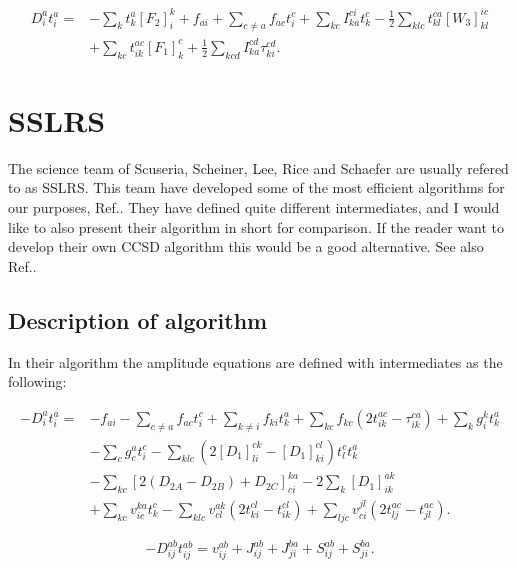 \begin{align}
D_i^a t_i^a = &
- \sum_{k} t_k^a
[F_2]_i^k
+ f_{ai} 
+ \sum_{c \not= a} f_{ac} t_i^c
+ \sum_{kc} I_{ka}^{ci} t_k^c 
- \frac{1}{2} \sum_{klc} t_{kl}^{ca} [W_3]_{kl}^{ic}
\nonumber \\ &
+ \sum_{kc} t_{ik}^{ac} [F_1]_k^c
+ \frac{1}{2} \sum_{kcd} I_{ka}^{cd} \tau_{ki}^{cd} 
.  \label{LINK_THIS_SHIT_1_T1}
\end{align}

\section{SSLRS}

The science team of Scuseria, Scheiner, Lee, Rice and Schaefer are usually refered to as SSLRS. This team have developed some of the most efficient algorithms for our purposes, Ref.\cite{sslrs_citation2}. They have defined quite different intermediates, and I would like to also present their algorithm in short for comparison. If the reader want to develop their own CCSD algorithm this would be a good alternative. See also Ref.\cite{sslrs_citation1}.

\subsection{Description of algorithm}

In their algorithm the amplitude equations are defined with intermediates as the following:

\begin{align}
- D_i^a t_i^a = &
- f_{ai} 
- \sum_{c \not= a} f_{ac} t_i^c 
+ \sum_{k \not= i} f_{ki} t_k^a
+ \sum_{kc} f_{kc} (2t_{ik}^{ac} - \tau_{ik}^{ca})
+ \sum_k g_i^k t_k^a \label{SSRS1} \\ &
- \sum_c g_c^a t_i^c 
- \sum_{klc} \left( 2 [D_1]_{li}^{ck} - [D_1]_{ki}^{cl} \right) t_l^c t_k^a \nonumber \\ &
- \sum_{kc} [2(D_{2A} - D_{2B}) + D_{2C}]_{ci}^{ka} 
- 2 \sum_k [D_1]_{ik}^{ak}  \nonumber \\ &
+ \sum_{kc} v_{ic}^{ka} t_k^c
- \sum_{klc} v_{cl}^{ak} ( 2 t_{ki}^{cl} - t_{ik}^{cl} )
+ \sum_{ljc} v_{ci}^{jl} ( 2 t_{lj}^{ac} - t_{jl}^{ac} ) .
\nonumber
\end{align}

\begin{equation}
- D_{ij}^{ab} t_{ij}^{ab} = v_{ij}^{ab} + J_{ij}^{ab} + J_{ji}^{ba} + S_{ij}^{ab} + S_{ji}^{ba} . \label{SSRS2}
\end{equation}

